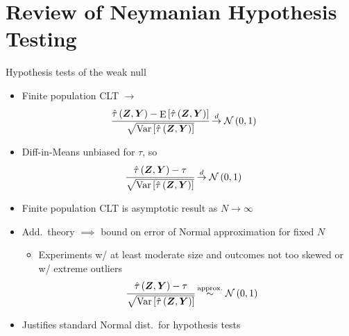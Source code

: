 \documentclass[table, xcolor = {dvipsnames}, 9pt]{beamer}
\theoremstyle{plain}
\DeclareMathOperator{\E}{\rm{E}}
\DeclareMathOperator{\Var}{\rm{Var}}
\begin{document}
\section{Review of Neymanian Hypothesis Testing}
\begin{frame}{Hypothesis tests of the weak null} \vfill
\begin{itemize} \vfill
\item Finite population CLT $\rightarrow$ \vfill
\begin{align*}
\cfrac{\hat{\tau}\left(\bm{Z}, \bm{Y}\right) - \E\left[\hat{\tau}\left(\bm{Z}, \bm{Y}\right)\right]}{\sqrt{\Var\left[\hat{\tau}\left(\bm{Z}, \bm{Y}\right)\right]}} & \overset{d}{\to} \mathcal{N}\left(0, 1\right)
\end{align*} \vfill
\item Diff-in-Means unbiased for $\tau$, so  \vfill
\begin{align*}
\cfrac{\hat{\tau}\left(\bm{Z}, \bm{Y}\right) - \tau}{\sqrt{\Var\left[\hat{\tau}\left(\bm{Z}, \bm{Y}\right)\right]}} & \overset{d}{\to} \mathcal{N}\left(0, 1\right)
\end{align*} \vfill
\item Finite population CLT is asymptotic result as $N \to \infty$ \vfill
\item Add.~theory $\implies$ bound on error of Normal approximation for fixed $N$ \vfill
\begin{itemize} \vfill
\item Experiments w/ at least moderate size and outcomes not too skewed or w/ extreme outliers \vfill
\begin{align*}
\cfrac{\hat{\tau}\left(\bm{Z}, \bm{Y}\right) - \tau}{\sqrt{\Var\left[\hat{\tau}\left(\bm{Z}, \bm{Y}\right)\right]}} & \overset{\text{approx.}}{\sim} \mathcal{N}\left(0, 1\right)
\end{align*} \vfill
\end{itemize} \vfill
\item Justifies standard Normal dist.~for hypothesis tests \vfill
\end{itemize} \vfill
\end{frame}
\end{document}
